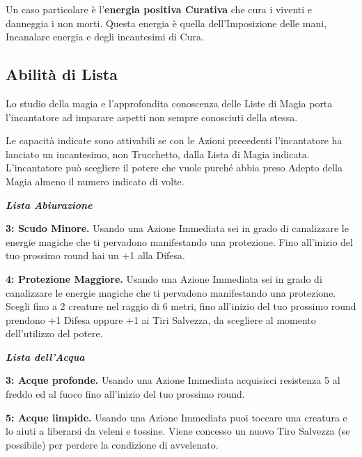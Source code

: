 \begin{multicols}{2}
Un caso particolare è l'\textbf{energia positiva Curativa} che cura i viventi e danneggia i non morti. Questa energia è quella dell'Imposizione delle mani, Incanalare energia e degli incantesimi di Cura.

\subsection{Abilità di Lista}\label{abilitadilista}\hypertarget{abilitadilista}{}


Lo studio della magia e l'approfondita conoscenza delle Liste di Magia porta l'incantatore ad imparare aspetti non sempre conosciuti della stessa.

Le capacità indicate sono attivabili se con le Azioni precedenti l'incantatore ha lanciato un incantesimo, non Trucchetto, dalla Lista di Magia indicata. L'incantatore può scegliere il potere che vuole purché abbia preso Adepto della Magia almeno il numero indicato di volte.

\emph{\textbf{Lista Abiurazione}}

\textbf{3: Scudo Minore.} Usando una Azione Immediata sei in grado di canalizzare le energie magiche che ti pervadono manifestando una protezione. Fino all'inizio del tuo prossimo round hai un +1 alla Difesa.

\textbf{4: Protezione Maggiore.} Usando una Azione Immediata sei in grado di canalizzare le energie magiche che ti pervadono manifestando una protezione. Scegli fino a 2 creature nel raggio di 6 metri, fino all'inizio del tuo prossimo round prendono +1 Difesa oppure +1 ai Tiri Salvezza, da scegliere al momento dell'utilizzo del potere.

\emph{\textbf{Lista dell'Acqua}}

\textbf{3: Acque profonde.} Usando una Azione Immediata acquisisci resistenza 5 al freddo ed al fuoco fino all'inizio del tuo prossimo round.

\textbf{5: Acque limpide.} Usando una Azione Immediata puoi toccare una creatura e lo aiuti a liberarsi da veleni e tossine. Viene concesso un nuovo Tiro Salvezza (se possibile) per perdere la condizione di avvelenato.


\end{multicols}
